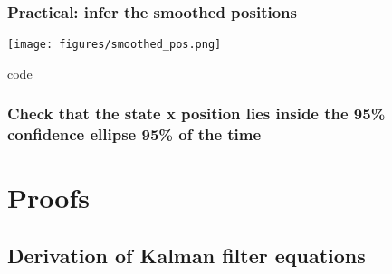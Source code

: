 \begin{frame}
    \frametitle{Practical: infer the smoothed positions}

    \begin{center}
        \texttt{[image: figures/smoothed\_pos.png]}
    \end{center}
    \hfill\href{}{code}
\end{frame}

\begin{frame}
    \frametitle{Check that the state x position lies inside the 95\%
    confidence ellipse 95\% of the time}

    \begin{center}
    \end{center}

% 
% 

\end{frame}

\section{Proofs}

\subsection{Derivation of Kalman filter equations}

